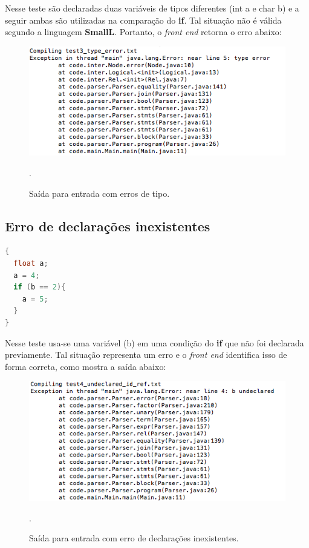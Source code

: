 Nesse teste são declaradas duas variáveis de tipos diferentes (int a e char b) e a seguir ambas são utilizadas na comparação do \textbf{if}. Tal situação não é válida segundo a linguagem \textbf{SmallL}. Portanto, o \textit{front end} retorna o erro abaixo:

\begin{figure}[H]
    \includegraphics[width=1\textwidth]{imgs/test3.png}
    \caption{Saída para entrada com erros de tipo.}.
    \label{fig:test3}
\end{figure}


\subsection{Erro de declarações inexistentes}

\begin{lstlisting}[language=C, caption=Teste de declarações inexistentes.]
{
  float a;
  a = 4;
  if (b == 2){
    a = 5;
  }
}
\end{lstlisting}

Nesse teste usa-se uma variável (b) em uma condição do \textbf{if} que não foi declarada previamente. Tal situação representa um erro e o \textit{front end} identifica isso de forma correta, como mostra a saída abaixo:

\begin{figure}[H]
    \includegraphics[width=1\textwidth]{imgs/test4.png}
    \caption{Saída para entrada com erro de declarações inexistentes.}.
    \label{fig:test4}
\end{figure}


